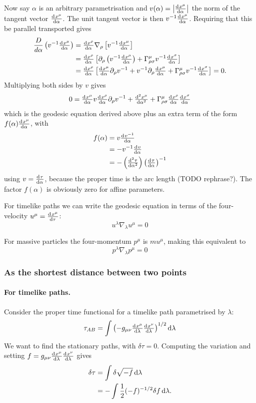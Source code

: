 Now say $\alpha$ is an arbitrary parametrisation and $v(\alpha) = \left|\od{x^\mu}{\alpha}\right|$ the norm of the tangent vector $\od{x^\mu}{\alpha}$. The unit tangent vector is then $v^{-1}\od{x^\mu}{\alpha}$. Requiring that this be parallel transported gives
\begin{align}
\frac{D}{d\alpha}\left(v^{-1}\od{x^\mu}{\alpha}\right) &= \od{x^\rho}{\alpha}\nabla_\rho\left[v^{-1}\od{x^\mu}{\alpha}\right] \\
&= \od{x^\rho}{\alpha} \left[\partial_\rho \left(v^{-1}\od{x^\mu}{\alpha}\right) + \Gamma^\mu_{\rho\sigma}v^{-1}\od{x^\sigma}{\alpha}\right] \\
&= \od{x^\rho}{\alpha} \left[\od{x^\mu}{\alpha}\partial_\rho v^{-1} + v^{-1}\partial_\rho \od{x^\mu}{\alpha} + \Gamma^\mu_{\rho\sigma}v^{-1}\od{x^\sigma}{\alpha}\right] = 0.
\end{align}
Multiplying both sides by $v$ gives
\[ 0 = \od{x^\mu}{\alpha}v\od{x^\rho}{\alpha}\partial_\rho v^{-1} + \od[2]{x^\mu}{\alpha} + \Gamma^\mu_{\rho\sigma}\od{x^\rho}{\alpha}\od{x^\sigma}{\alpha} \]
which is the geodesic equation derived above plus an extra term of the form $f(\alpha)\od{x^\mu}{\alpha}$, with
\begin{align}
f(\alpha) &= v \od{v^{-1}}{\alpha} \\
&= -v^{-1}\od{v}{\alpha} \\
&= - \left(\od[2]{\tau}{\alpha}\right)\left(\od{\tau}{\alpha}\right)^{-1}
\end{align}
using $v = \od{\tau}{\alpha}$, because the proper time is the arc length (TODO rephrase?). The factor $f(\alpha)$ is obviously zero for affine parameters.

For timelike paths we can write the geodesic equation in terms of the four-velocity $u^\mu = \od{x^\mu}{\tau}$:
\[ u^\lambda\nabla_\lambda u^\mu = 0 \]

For massive particles the four-momentum $p^\mu$ is $mu^\mu$, making this equivalent to
\[ p^\lambda\nabla_\lambda p^\mu = 0 \]

\subsubsection{As the shortest distance between two points}
\paragraph{For timelike paths.} Consider the proper time functional for a timelike path parametrised by $\lambda$:
\[ \tau_{AB} = \int \left(-g_{\mu\nu} \od{x^\mu}{\lambda}\od{x^\nu}{\lambda}\right)^{1/2} \diff{\lambda} \]
We want to find the stationary paths, with $\delta \tau = 0$. Computing the variation and setting $f = g_{\mu\nu} \od{x^\mu}{\lambda}\od{x^\nu}{\lambda}$ gives
\begin{align}
\delta \tau &= \int \delta\sqrt{-f}\operatorname{d \!}{\lambda} \\
&= -\int \frac{1}{2}(-f)^{-1/2}\delta f \operatorname{d \!}{\lambda}.
\end{align}


